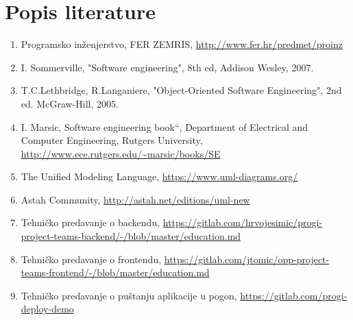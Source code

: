 \chapter*{Popis literature}
	 	
 	
		
		
		\begin{enumerate}
			
			
			\item  Programsko inženjerstvo, FER ZEMRIS, \url{http://www.fer.hr/predmet/proinz}
			
			\item  I. Sommerville, "Software engineering", 8th ed, Addison Wesley, 2007.
			
			\item  T.C.Lethbridge, R.Langaniere, "Object-Oriented Software Engineering", 2nd ed. McGraw-Hill, 2005.
			
			\item  I. Marsic, Software engineering book``, Department of Electrical and Computer Engineering, Rutgers University, \url{http://www.ece.rutgers.edu/~marsic/books/SE}
			
			\item  The Unified Modeling Language, \url{https://www.uml-diagrams.org/}
			
			\item  Astah Community, \url{http://astah.net/editions/uml-new}
			
			\item  Tehničko predavanje o backendu, \url{https://gitlab.com/hrvojesimic/progi-project-teams-backend/-/blob/master/education.md}
			
			\item  Tehničko predavanje o frontendu, \url{https://gitlab.com/jtomic/opp-project-teams-frontend/-/blob/master/education.md}
			
			\item  Tehničko predavanje o puštanju aplikacije u pogon, \url{https://gitlab.com/progi-deploy-demo}
		\end{enumerate}
		
		 